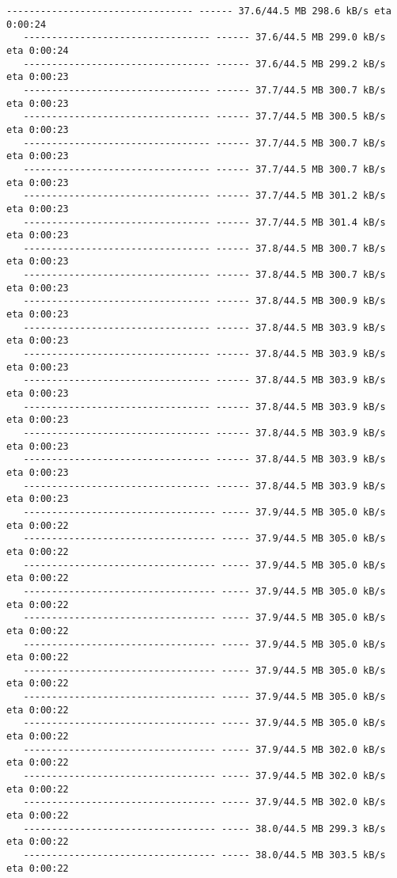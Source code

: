 \documentclass[11pt]{article}
\begin{document}
\begin{Verbatim}[commandchars=\\\{\}]
   --------------------------------- ------ 37.6/44.5 MB 298.6 kB/s eta 0:00:24
   --------------------------------- ------ 37.6/44.5 MB 299.0 kB/s eta 0:00:24
   --------------------------------- ------ 37.6/44.5 MB 299.2 kB/s eta 0:00:23
   --------------------------------- ------ 37.7/44.5 MB 300.7 kB/s eta 0:00:23
   --------------------------------- ------ 37.7/44.5 MB 300.5 kB/s eta 0:00:23
   --------------------------------- ------ 37.7/44.5 MB 300.7 kB/s eta 0:00:23
   --------------------------------- ------ 37.7/44.5 MB 300.7 kB/s eta 0:00:23
   --------------------------------- ------ 37.7/44.5 MB 301.2 kB/s eta 0:00:23
   --------------------------------- ------ 37.7/44.5 MB 301.4 kB/s eta 0:00:23
   --------------------------------- ------ 37.8/44.5 MB 300.7 kB/s eta 0:00:23
   --------------------------------- ------ 37.8/44.5 MB 300.7 kB/s eta 0:00:23
   --------------------------------- ------ 37.8/44.5 MB 300.9 kB/s eta 0:00:23
   --------------------------------- ------ 37.8/44.5 MB 303.9 kB/s eta 0:00:23
   --------------------------------- ------ 37.8/44.5 MB 303.9 kB/s eta 0:00:23
   --------------------------------- ------ 37.8/44.5 MB 303.9 kB/s eta 0:00:23
   --------------------------------- ------ 37.8/44.5 MB 303.9 kB/s eta 0:00:23
   --------------------------------- ------ 37.8/44.5 MB 303.9 kB/s eta 0:00:23
   --------------------------------- ------ 37.8/44.5 MB 303.9 kB/s eta 0:00:23
   --------------------------------- ------ 37.8/44.5 MB 303.9 kB/s eta 0:00:23
   ---------------------------------- ----- 37.9/44.5 MB 305.0 kB/s eta 0:00:22
   ---------------------------------- ----- 37.9/44.5 MB 305.0 kB/s eta 0:00:22
   ---------------------------------- ----- 37.9/44.5 MB 305.0 kB/s eta 0:00:22
   ---------------------------------- ----- 37.9/44.5 MB 305.0 kB/s eta 0:00:22
   ---------------------------------- ----- 37.9/44.5 MB 305.0 kB/s eta 0:00:22
   ---------------------------------- ----- 37.9/44.5 MB 305.0 kB/s eta 0:00:22
   ---------------------------------- ----- 37.9/44.5 MB 305.0 kB/s eta 0:00:22
   ---------------------------------- ----- 37.9/44.5 MB 305.0 kB/s eta 0:00:22
   ---------------------------------- ----- 37.9/44.5 MB 305.0 kB/s eta 0:00:22
   ---------------------------------- ----- 37.9/44.5 MB 302.0 kB/s eta 0:00:22
   ---------------------------------- ----- 37.9/44.5 MB 302.0 kB/s eta 0:00:22
   ---------------------------------- ----- 37.9/44.5 MB 302.0 kB/s eta 0:00:22
   ---------------------------------- ----- 38.0/44.5 MB 299.3 kB/s eta 0:00:22
   ---------------------------------- ----- 38.0/44.5 MB 303.5 kB/s eta 0:00:22

\end{Verbatim}
\end{document}
